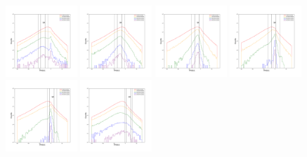 \documentclass[12pt,prd]{article}
\begin{document}
\begin{figure}[h!]
\includegraphics[width=0.24\textwidth]{../figures/scanning_plotsgaiascan_l67_5_b74_4_ra208_6_dec35_1_npy_9.pdf}
\includegraphics[width=0.24\textwidth]{../figures/scanning_plotsgaiascan_l67_5_b74_4_ra208_6_dec35_1_npy_10.pdf}
\includegraphics[width=0.24\textwidth]{../figures/scanning_plotsgaiascan_l67_5_b74_4_ra208_6_dec35_1_npy_11.pdf}
\includegraphics[width=0.24\textwidth]{../figures/scanning_plotsgaiascan_l67_5_b74_4_ra208_6_dec35_1_npy_12.pdf}
\includegraphics[width=0.24\textwidth]{../figures/scanning_plotsgaiascan_l67_5_b74_4_ra208_6_dec35_1_npy_13.pdf}
\includegraphics[width=0.24\textwidth]{../figures/scanning_plotsgaiascan_l67_5_b74_4_ra208_6_dec35_1_npy_14.pdf}

\end{figure}
\end{document}
